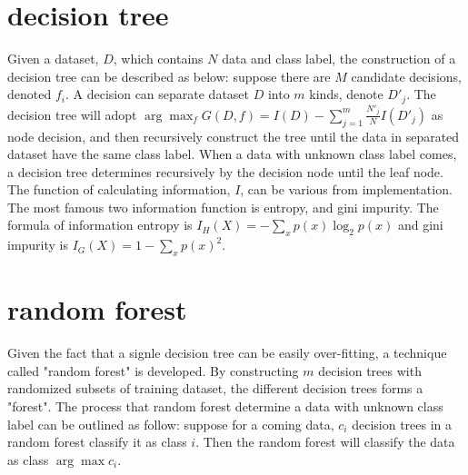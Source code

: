 \documentclass[twocolumn,10pt]{article}
\begin{document}
\section{decision tree}
  Given a dataset, $D$, which contains $N$ data and class label, the construction of a decision tree can be described as 
  below: suppose there are $M$ candidate decisions, denoted $f_i$. A decision can separate dataset $D$ into $m$ kinds, denote 
  $D'_j$. The decision tree will adopt $\arg\max_{f} G(D, f)=I(D)-\sum^m_{j=1}\frac{N'_j}{N}I(D'_j)$ as node decision, 
  and then recursively construct the tree until the data in separated dataset have the same class label. 
  When a data with unknown class label comes, a decision tree determines recursively by the decision node until the leaf node.
  The function of calculating information, $I$, can be various from implementation. The most famous two information function is 
  entropy, and gini impurity. The formula of information entropy is $I_H(X)=-\sum_{x}p(x)\log_2p(x)$ 
  and gini impurity is $I_G(X)=1-\sum_{x}p(x)^2$.

\section{random forest}
  Given the fact that a signle decision tree can be easily over-fitting, a technique called "random forest" is developed. By 
  constructing $m$ decision trees with randomized subsets of training dataset, the different decision trees forms a "forest". 
  The process that random forest determine a data with unknown class label can be outlined as follow: suppose for a coming data, 
  $c_i$ decision trees in a random forest classify it as class $i$. Then the random forest will classify the data as class $\arg\max c_i$.
\end{document}
